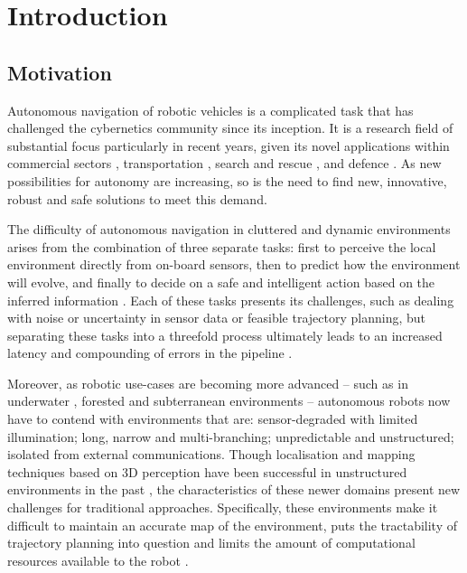 \chapter{Introduction}
\label{chap:1_introduction}

\section{Motivation}
Autonomous navigation of robotic vehicles is a complicated task that has challenged the cybernetics community since its inception.
It is a research field of substantial focus particularly in recent years, given its novel applications within commercial sectors \cite{eelumeSale, anymalInTheField, CogniteVisualInspection}, transportation \cite{autoferryNTNU}, search and rescue \cite{washingtonPost}, and defence \cite{darpaAutonomy}. As new possibilities for autonomy are increasing, so is the need to find new, innovative, robust and safe solutions to meet this demand.

The difficulty of autonomous navigation in cluttered and dynamic environments arises from the combination of three separate tasks: first to perceive the local environment directly from on-board sensors, then to predict how the environment will evolve, and finally to decide on a safe and intelligent action based on the inferred information \cite{darpaCar}. Each of these tasks presents its challenges, such as dealing with noise or uncertainty in sensor data or feasible trajectory planning, but separating these tasks into a threefold process ultimately leads to an increased latency and compounding of errors in the pipeline \cite{HighSpeedFlightWild}.

Moreover, as robotic use-cases are becoming more advanced -- such as in underwater \cite{eelume}, forested \cite{HighSpeedFlightWild} and subterranean environments \cite{GBplanner} -- autonomous robots now have to contend with environments that are: sensor-degraded with limited illumination; long, narrow and multi-branching; unpredictable and unstructured; isolated from external communications. Though localisation and mapping techniques based on 3D perception have been successful in unstructured environments in the past \cite{navigationSLAM}, the characteristics of these newer domains present new challenges for traditional approaches. Specifically, these environments make it difficult to maintain an accurate map of the environment, puts the tractability of trajectory planning into question and limits the amount of computational resources available to the robot \cite{LearningStateRepresentation, NavRep_unsupervised, HighSpeedFlightWild, LBplanner}.

